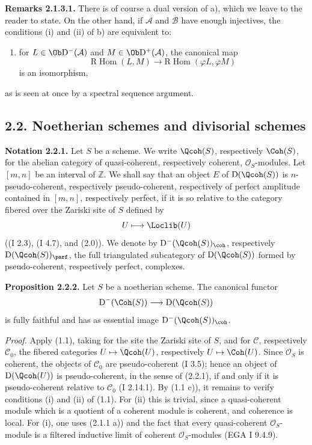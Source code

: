\documentclass[11pt]{article}
\begin{document}
\textbf{Remarks 2.1.3.1.} There is of course a dual version of a), which we leave to the reader to state. On the other hand, if $\mathcal A$ and $\mathcal B$ have enough injectives, the conditions (i) and (ii) of b) are equivalent to:
\begin{enumerate}[label=(\roman*),start=3]
\item for $L\in\Ob\mathrm D^{-}(\mathcal A)$ and $M\in\Ob\mathrm D^{+}(\mathcal A)$, the canonical map
\[
\mathrm R\!\operatorname{Hom}(L,M)\longrightarrow
\mathrm R\!\operatorname{Hom}(\varphi L,\varphi M)
\]
is an isomorphism,
\end{enumerate}
as is seen at once by a spectral sequence argument.

\subsection*{2.2. Noetherian schemes and divisorial schemes}

\textbf{Notation 2.2.1.} Let $S$ be a scheme. We write $\Qcoh(S)$, respectively $\Coh(S)$, for the abelian category of quasi-coherent, respectively coherent, $\mathcal O_S$-modules. Let $[m,n]$ be an interval of $\mathbb Z$. We shall say that an object $E$ of $\mathrm D(\Qcoh(S))$ is $n$-pseudo-coherent, respectively pseudo-coherent, respectively of perfect amplitude contained in $[m,n]$, respectively perfect, if it is so relative to the category fibered over the Zariski site of $S$ defined by
\[
U\longmapsto \Loclib(U)
\]
((I 2.3), (I 4.7), and (2.0)). We denote by $\mathrm D^{-}(\Qcoh(S))_{\coh}$, respectively $\mathrm D(\Qcoh(S))_{\parf}$, the full triangulated subcategory of $\mathrm D(\Qcoh(S))$ formed by pseudo-coherent, respectively perfect, complexes.

\textbf{Proposition 2.2.2.} Let $S$ be a noetherian scheme. The canonical functor
\[
\mathrm D^{-}(\Coh(S))\longrightarrow \mathrm D(\Qcoh(S))
\]
is fully faithful and has as essential image $\mathrm D^{-}(\Qcoh(S))_{\coh}$.

\emph{Proof.} Apply (1.1), taking for the site the Zariski site of $S$, and for $\mathcal C$, respectively $\mathcal C_0$, the fibered categories $U\mapsto\Qcoh(U)$, respectively $U\mapsto\Coh(U)$. Since $\mathcal O_S$ is coherent, the objects of $\mathcal C_0$ are pseudo-coherent (I 3.5); hence an object of $\mathrm D(\Qcoh(U))$ is pseudo-coherent, in the sense of (2.2.1), if and only if it is pseudo-coherent relative to $\mathcal C_0$ (I 2.14.1). By (1.1 c)), it remains to verify conditions (i) and (ii) of (1.1). For (ii) this is trivial, since a quasi-coherent module which is a quotient of a coherent module is coherent, and coherence is local. For (i), one uses (2.1.1 a)) and the fact that every quasi-coherent $\mathcal O_S$-module is a filtered inductive limit of coherent $\mathcal O_S$-modules (EGA I 9.4.9).
\end{document}
